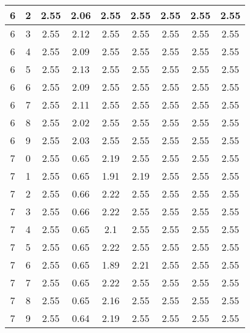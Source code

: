 \begin{longtable}{|c|c||c||c|c|c||c|c|c|}
	6 & 2 & 2.55 & 2.06 & 2.55 & 2.55 & 2.55 & 2.55 & 2.55 \\ \hline
	6 & 3 & 2.55 & 2.12 & 2.55 & 2.55 & 2.55 & 2.55 & 2.55 \\ \hline
	6 & 4 & 2.55 & 2.09 & 2.55 & 2.55 & 2.55 & 2.55 & 2.55 \\ \hline
	6 & 5 & 2.55 & 2.13 & 2.55 & 2.55 & 2.55 & 2.55 & 2.55 \\ \hline
	6 & 6 & 2.55 & 2.09 & 2.55 & 2.55 & 2.55 & 2.55 & 2.55 \\ \hline
	6 & 7 & 2.55 & 2.11 & 2.55 & 2.55 & 2.55 & 2.55 & 2.55 \\ \hline
	6 & 8 & 2.55 & 2.02 & 2.55 & 2.55 & 2.55 & 2.55 & 2.55 \\ \hline
	6 & 9 & 2.55 & 2.03 & 2.55 & 2.55 & 2.55 & 2.55 & 2.55 \\ \hline
	7 & 0 & 2.55 & 0.65 & 2.19 & 2.55 & 2.55 & 2.55 & 2.55 \\ \hline
	7 & 1 & 2.55 & 0.65 & 1.91 & 2.19 & 2.55 & 2.55 & 2.55 \\ \hline
	7 & 2 & 2.55 & 0.66 & 2.22 & 2.55 & 2.55 & 2.55 & 2.55 \\ \hline
	7 & 3 & 2.55 & 0.66 & 2.22 & 2.55 & 2.55 & 2.55 & 2.55 \\ \hline
	7 & 4 & 2.55 & 0.65 & 2.1 & 2.55 & 2.55 & 2.55 & 2.55 \\ \hline
	7 & 5 & 2.55 & 0.65 & 2.22 & 2.55 & 2.55 & 2.55 & 2.55 \\ \hline
	7 & 6 & 2.55 & 0.65 & 1.89 & 2.21 & 2.55 & 2.55 & 2.55 \\ \hline
	7 & 7 & 2.55 & 0.65 & 2.22 & 2.55 & 2.55 & 2.55 & 2.55 \\ \hline
	7 & 8 & 2.55 & 0.65 & 2.16 & 2.55 & 2.55 & 2.55 & 2.55 \\ \hline
	7 & 9 & 2.55 & 0.64 & 2.19 & 2.55 & 2.55 & 2.55 & 2.55 \\ \hline
\end{longtable}
\clearpage{}
